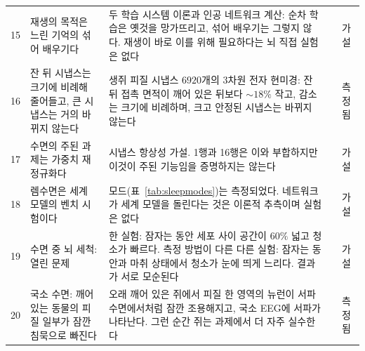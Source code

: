 {\begin{longtable}{>{\raggedright}p{0.5cm}>{\raggedright}p{4.0cm}>{\raggedright}p{5.6cm}>{\raggedright}p{2.3cm}>{\raggedright\arraybackslash}p{1.7cm}}
15 & 재생의 목적은 느린 기억의 섞어 배우기다 & 두 학습 시스템 이론과 인공 네트워크 계산: 순차 학습은 옛것을 망가뜨리고, 섞어 배우기는 그렇지 않다. 재생이 바로 이를 위해 필요하다는 뇌 직접 실험은 없다 & \cite{McClelland1995} & 가설 \\
16 & 잔 뒤 시냅스는 크기에 비례해 줄어들고, 큰 시냅스는 거의 바뀌지 않는다 & 생쥐 피질 시냅스 $6920$개의 3차원 전자 현미경: 잔 뒤 접촉 면적이 깨어 있은 뒤보다 $\sim18\%$ 작고, 감소는 크기에 비례하며, 크고 안정된 시냅스는 바뀌지 않는다 & \cite{deVivo2017} & 측정됨 \\
17 & 수면의 주된 과제는 가중치 재정규화다 & 시냅스 항상성 가설. 1행과 16행은 이와 부합하지만 이것이 주된 기능임을 증명하지는 않는다 & \cite{TononiCirelli2014} & 가설 \\
18 & 렘수면은 세계 모델의 벤치 시험이다 & 모드(표~\ref{tab:sleepmodes})는 측정되었다. 네트워크가 세계 모델을 돌린다는 것은 이론적 추측이며 실험은 없다 & \cite{Hobson2009} & 가설 \\
19 & 수면 중 뇌 세척: 열린 문제 & 한 실험: 잠자는 동안 세포 사이 공간이 $60\%$ 넓고 청소가 빠르다. 측정 방법이 다른 다른 실험: 잠자는 동안과 마취 상태에서 청소가 눈에 띄게 느리다. 결과가 서로 모순된다 & \cite{Xie2013,Miao2024} & 가설 \\
20 & 국소 수면: 깨어 있는 동물의 피질 일부가 잠깐 침묵으로 빠진다 & 오래 깨어 있은 쥐에서 피질 한 영역의 뉴런이 서파 수면에서처럼 잠깐 조용해지고, 국소 EEG에 서파가 나타난다. 그런 순간 쥐는 과제에서 더 자주 실수한다 & \cite{Vyazovskiy2011} & 측정됨 \\
\bottomrule
\end{longtable}}
